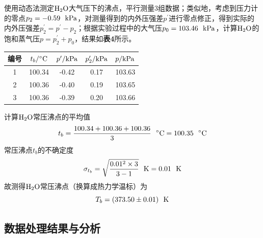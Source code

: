 \documentclass[12pt]{article}
\begin{document}
使用动态法测定$\rm H_{2}O$大气压下的沸点，平行测量3组数据；类似地，考虑到压力计的零点$p_{2}=-0.59\ \ {\rm kPa}$，对测量得到的内外压强差$p^{\prime}$进行零点修正，得到实际的内外压强差$p_{2}^{\prime}=p^{\prime}-p_{2}$；根据实验过程中的大气压$p_{0}=103.46\ \ {\rm kPa}$，计算$\rm H_{2}O$的饱和蒸气压$ p=p^{\prime}_{2}+p_{0}$，结果如\textbf{表4}所示。
 \begin{table}[h]
	\centering
	\begin{tabular}{ccccc}
		\toprule
		编号 & $t_{b}/{\rm ^{\circ}C}$& $p^{\prime}/{\rm kPa}$ & $p_{2}^{\prime}/{\rm kPa}$ & $p/{\rm kPa}$  \\
		\midrule
		1 & 100.34 & -0.42 & 0.17 & 103.63 \\
		2 & 100.36 & -0.40 & 0.19 & 103.65 \\
		3 & 100.36 & -0.39 & 0.20 & 103.66 \\
		\bottomrule
	\end{tabular}
\end{table}
\par
计算$\rm H_{2}O$常压沸点的平均值
$$
t_{b}=\frac{100.34+100.36+100.36}{3} \ \ {\rm ^{\circ}C}=100.35\ \ {\rm {^{\circ}C}}
$$
常压沸点$t_{b}$的不确定度
$$
\sigma_{t_{b}}=\sqrt{\frac{0.01^{2}\times 3}{3-1}} \ \ {\rm K}=0.01\ \ {\rm K} 
$$
故测得$\rm H_{2}O$常压沸点（换算成热力学温标）为
$$
T_{b}=(373.50\pm 0.01)\ \ {\rm K}
$$
\vbox{}
 \subsection{数据处理结果与分析}
\end{document}
